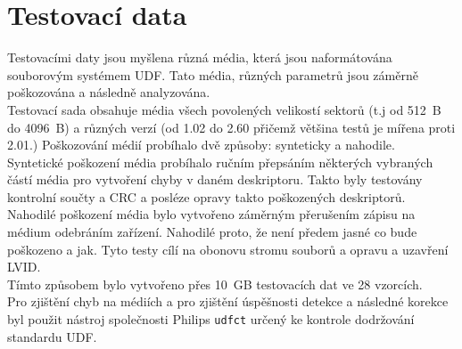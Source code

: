 \section{Testovací data}
\label{sec:data}
Testovacími daty jsou myšlena různá média, která jsou naformátována souborovým systémem UDF. Tato média, různých parametrů jsou záměrně poškozována a následně analyzována.\\
Testovací sada obsahuje média všech povolených velikostí sektorů (t.j od 512~B do 4096~B) a různých verzí (od 1.02 do 2.60 přičemž většina testů je mířena proti 2.01.) Poškozování médií probíhalo dvě způsoby: synteticky a nahodile.\\
Syntetické poškození média probíhalo ručním přepsáním některých vybraných částí média pro vytvoření chyby v daném deskriptoru. Takto byly testovány kontrolní součty a CRC a posléze opravy takto poškozených deskriptorů.
Nahodilé poškození média bylo vytvořeno záměrným přerušením zápisu na médium odebráním zařízení. Nahodilé proto, že není předem jasné co bude poškozeno a jak. Tyto testy cílí na obonovu stromu souborů a opravu a uzavření LVID.\\
Tímto způsobem bylo vytvořeno přes 10~GB testovacích dat ve 28 vzorcích.\\
Pro zjištění chyb na médiích a pro zjištění úspěšnosti detekce a následné korekce byl použit nástroj společnosti Philips \texttt{udfct} \cite{wayback} určený ke kontrole dodržování standardu UDF.


